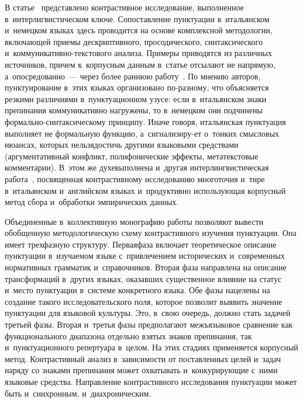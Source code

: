 \begin{multicols}{2}
 В статье~\cite[с.~57--73]{10-nu} представлено контрастивное исследование, выполненное в~интерлигвистическом 
ключе. Со\-по\-став\-ле\-ние 
пунктуации в~италь\-ян\-ском и~немецком языках здесь проводится на основе 
комплексной методологии, вклю\-ча\-ющей приемы дескриптивного, 
просодического, синтаксического и~ком\-му\-ни\-ка\-тив\-но-текс\-то\-во\-го 
анализа. Примеры приводятся из различных источников, причем 
к~корпусным данным в~статье отсылают не напрямую, а~опосредованно~--- 
через более раннюю работу~\cite{13-nu}. По мнению авторов, 
пунктуирование в~этих языках организовано по-раз\-но\-му, что объясняется 
резкими различиями в~пунктуационном узусе: если в~итальянском знаки 
препинания коммуникативно на\-гру\-же\-ны, то в~немецком они подчинены 
фор\-маль\-но-син\-так\-си\-че\-ско\-му принципу. Иначе говоря, итальянская 
пунктуация выполняет не формальную функцию, а~сигнализиру-\linebreak ет о~тон\-ких 
смыс\-ло\-вых нюансах, которых нельзя\linebreak достичь другими языковыми 
средствами (аргументативный конфликт, полифонические эффекты, 
метатекстовые комментарии). В~этом же духе\linebreak выполнена и~другая 
интерлингвистическая работа~\cite{14-nu}, по\-свя\-щен\-ная контрастивному 
исследованию многоточия и~тире в~италь\-ян\-ском и~анг\-лий\-ском языках 
и~продуктивно ис\-поль\-зу\-ющая \mbox{корпусный} метод сбора и~обработки 
эмпирических данных.
     
     Объединенные в~коллективную монографию рабо\-ты позволяют 
вывести обобщенную ме\-то\-до\-ло\-гическую схему контрастивного изуче\-ния 
пунктуации. Она имеет трехфазную структуру. Первая\linebreak фаза включает 
тео\-ре\-ти\-че\-ское описание пунктуации в~изуча\-емом языке с~привлечением 
исторических и~современных нормативных грамматик и~справочников. 
Вторая фаза на\-прав\-ле\-на на описание трансформаций в~других языках, 
оказавших существенное влияние на статус и~мес\-то пунктуации в~сис\-те\-ме 
конкретного языка. Обе фазы нацелены на создание такого 
исследовательского поля, которое поз\-во\-лит выявить значение пунктуации 
для языковой культуры. Это, в~свою очередь, долж\-но стать задачей треть\-ей 
фазы. Вторая и~\mbox{третья} фазы предполагают межъязыковое сравнение как 
функционального диапазона отдельно взятых знаков препинания, так 
и~пунктуационного репертуара в~целом. На этих стадиях применяется 
корпусный метод. Контрастивный анализ в~за\-ви\-си\-мости от по\-став\-лен\-ных 
целей и~задач наряду со знаками препинания может охватывать 
и~кон\-ку\-ри\-ру\-ющие с~ними языковые средства. На\-прав\-ле\-ние контрастивного 
исследования пунктуации может быть и~синхронным, и~диахроническим.


\end{multicols}
